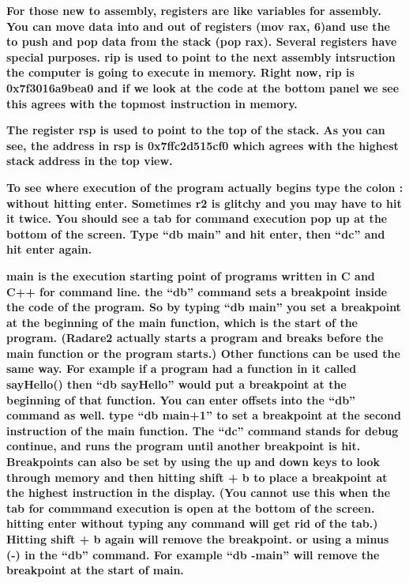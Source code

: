 \documentclass[letterpaper]{article}
\newcommand{\sitfig}[3]{
\begin{figure}[H]
\centering
\makebox[\textwidth][c]{
#2
}
\label{#1}
\end{figure}
}
\newcommand{\sitgfx}[4][scale=1.0]{
\sitfig{#3}{\texttt{[image: \#2]}}{#4}
}
\begin{document}
  
\sitgfx[width=5.8335in,height=3.6457in]{reversing-img027.png}{fig:unk}{TODO CAPTION}
 

\textbf{For those new to assembly, registers are like variables for assembly. You can move data into and out of
registers (mov rax, 6)and use the to push and pop data from the stack (pop rax). Several registers have special
purposes. rip is used to point to the next assembly intsruction the computer is going to execute in memory. Right now,
rip is 0x7f3016a9bea0 and if we look at the code at the bottom panel we see this agrees with the topmost instruction in
memory.}

  
\sitgfx[width=5.8335in,height=3.6457in]{reversing-img078.png}{fig:unk}{TODO CAPTION}
 

\textbf{The register rsp is used to point to the top of the stack. As you can see, the address in rsp is 0x7ffc2d515cf0
which agrees with the highest stack address in the top view.}

  
\sitgfx[width=5.8335in,height=3.6457in]{reversing-img079.png}{fig:unk}{TODO CAPTION}
 

\textbf{To see where execution of the program actually begins type the colon : without hitting enter. Sometimes r2 is
glitchy and you may have to hit it twice. You should see a tab for command execution pop up at the bottom of the
screen. Type ``db main'' and hit enter, then ``dc'' and hit enter again.}

  
\sitgfx[width=5.8335in,height=3.6457in]{reversing-img080.png}{fig:unk}{TODO CAPTION}
 

\textbf{main is the execution starting point of programs written in C and C++ for command line. the ``db'' command sets
a breakpoint inside the code of the program. So by typing ``db main'' you set a breakpoint at the beginning of the main
function, which is the start of the program. (Radare2 actually starts a program and breaks before the main function or
the program starts.) Other functions can be used the same way. For example if a program had a function in it called
sayHello() then ``db sayHello'' would put a breakpoint at the beginning of that function. You can enter offsets into
the ``db'' command as well. type ``db main+1'' to set a breakpoint at the second instruction of the main function. The
``dc'' command stands for debug continue, and runs the program until another breakpoint is hit. Breakpoints can also be
set by using the up and down keys to look through memory and then hitting shift + b to place a breakpoint at the
highest instruction in the display. (You cannot use this when the tab for commmand execution is open at the bottom of
the screen. hitting enter without typing any command will get rid of the tab.) Hitting shift + b again will remove the
breakpoint. or using a minus (-) in the ``db'' command. For example ``db -main'' will remove the breakpoint at the
start of main.}
\end{document}
